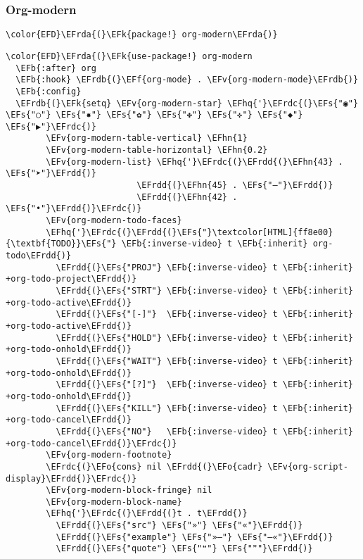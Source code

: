 \documentclass[12pt]{article}
\theoremstyle{plain}%
\theoremstyle{definition}
\theoremstyle{remark}
\newcommand{\EFs}[1]{\textcolor{EFs}{#1}} %
\newcommand{\EFk}[1]{\textcolor{EFk}{#1}} %
\newcommand{\EFb}[1]{\textcolor{EFb}{#1}} %
\newcommand{\EFf}[1]{\textcolor{EFf}{#1}} %
\newcommand{\EFv}[1]{\textcolor{EFv}{#1}} %
\newcommand{\EFo}[1]{\textcolor{EFo}{#1}} %
\newcommand{\EFhn}[1]{\textcolor{EFhn}{\textbf{#1}}} %
\newcommand{\EFhq}[1]{\textcolor{EFhq}{#1}} %
\newcommand{\EFrda}[1]{\textcolor{EFrda}{#1}} %
\newcommand{\EFrdb}[1]{\textcolor{EFrdb}{#1}} %
\newcommand{\EFrdc}[1]{\textcolor{EFrdc}{#1}} %
\newcommand{\EFrdd}[1]{\textcolor{EFrdd}{#1}} %
\begin{document}
\subsubsection{Org-modern}
\label{sec:org4243beb}
\begin{Code}
\begin{Verbatim}
\color{EFD}\EFrda{(}\EFk{package!} org-modern\EFrda{)}
\end{Verbatim}
\end{Code}
\begin{Code}
\begin{Verbatim}
\color{EFD}\EFrda{(}\EFk{use-package!} org-modern
  \EFb{:after} org
  \EFb{:hook} \EFrdb{(}\EFf{org-mode} . \EFv{org-modern-mode}\EFrdb{)}
  \EFb{:config}
  \EFrdb{(}\EFk{setq} \EFv{org-modern-star} \EFhq{'}\EFrdc{(}\EFs{"◉"} \EFs{"○"} \EFs{"✸"} \EFs{"✿"} \EFs{"✤"} \EFs{"✜"} \EFs{"◆"} \EFs{"▶"}\EFrdc{)}
        \EFv{org-modern-table-vertical} \EFhn{1}
        \EFv{org-modern-table-horizontal} \EFhn{0.2}
        \EFv{org-modern-list} \EFhq{'}\EFrdc{(}\EFrdd{(}\EFhn{43} . \EFs{"➤"}\EFrdd{)}
                          \EFrdd{(}\EFhn{45} . \EFs{"–"}\EFrdd{)}
                          \EFrdd{(}\EFhn{42} . \EFs{"•"}\EFrdd{)}\EFrdc{)}
        \EFv{org-modern-todo-faces}
        \EFhq{'}\EFrdc{(}\EFrdd{(}\EFs{"}\textcolor[HTML]{ff8e00}{\textbf{TODO}}\EFs{"} \EFb{:inverse-video} t \EFb{:inherit} org-todo\EFrdd{)}
          \EFrdd{(}\EFs{"PROJ"} \EFb{:inverse-video} t \EFb{:inherit} +org-todo-project\EFrdd{)}
          \EFrdd{(}\EFs{"STRT"} \EFb{:inverse-video} t \EFb{:inherit} +org-todo-active\EFrdd{)}
          \EFrdd{(}\EFs{"[-]"}  \EFb{:inverse-video} t \EFb{:inherit} +org-todo-active\EFrdd{)}
          \EFrdd{(}\EFs{"HOLD"} \EFb{:inverse-video} t \EFb{:inherit} +org-todo-onhold\EFrdd{)}
          \EFrdd{(}\EFs{"WAIT"} \EFb{:inverse-video} t \EFb{:inherit} +org-todo-onhold\EFrdd{)}
          \EFrdd{(}\EFs{"[?]"}  \EFb{:inverse-video} t \EFb{:inherit} +org-todo-onhold\EFrdd{)}
          \EFrdd{(}\EFs{"KILL"} \EFb{:inverse-video} t \EFb{:inherit} +org-todo-cancel\EFrdd{)}
          \EFrdd{(}\EFs{"NO"}   \EFb{:inverse-video} t \EFb{:inherit} +org-todo-cancel\EFrdd{)}\EFrdc{)}
        \EFv{org-modern-footnote}
        \EFrdc{(}\EFo{cons} nil \EFrdd{(}\EFo{cadr} \EFv{org-script-display}\EFrdd{)}\EFrdc{)}
        \EFv{org-modern-block-fringe} nil
        \EFv{org-modern-block-name}
        \EFhq{'}\EFrdc{(}\EFrdd{(}t . t\EFrdd{)}
          \EFrdd{(}\EFs{"src"} \EFs{"»"} \EFs{"«"}\EFrdd{)}
          \EFrdd{(}\EFs{"example"} \EFs{"»–"} \EFs{"–«"}\EFrdd{)}
          \EFrdd{(}\EFs{"quote"} \EFs{"❝"} \EFs{"❞"}\EFrdd{)}

\end{Verbatim}
\end{Code}
\end{document}
